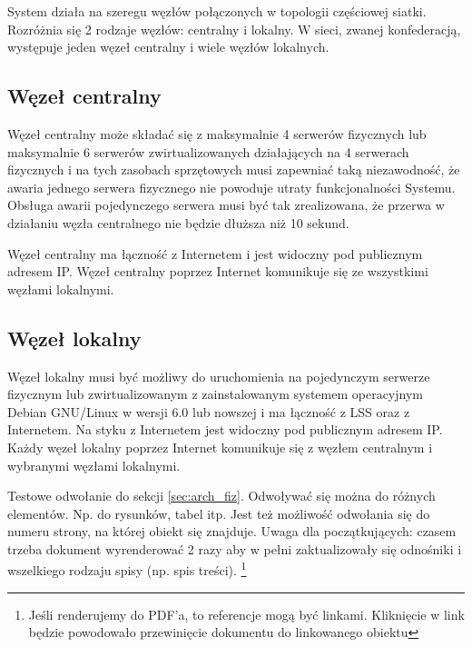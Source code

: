 \documentclass[a4paper]{report}
\begin{document}
System działa na szeregu węzłów połączonych w topologii częściowej siatki. Rozróżnia się 2 rodzaje węzłów: centralny i lokalny. W sieci, zwanej konfederacją, występuje jeden węzeł centralny i wiele węzłów lokalnych. 

\subsection{Węzeł centralny}
Węzeł centralny może składać się z maksymalnie 4 serwerów fizycznych lub maksymalnie 6 serwerów zwirtualizowanych działających na 4 serwerach fizycznych i na tych zasobach sprzętowych musi zapewniać taką 
niezawodność, że awaria jednego serwera fizycznego nie powoduje utraty funkcjonalności Systemu. Obsługa
awarii pojedynczego serwera musi być tak zrealizowana, że przerwa w działaniu węzła centralnego nie będzie dłuższa niż 10 sekund.

Węzeł centralny ma łączność z Internetem i jest widoczny pod publicznym adresem IP. Węzeł centralny poprzez Internet komunikuje się ze wszystkimi węzłami lokalnymi.

\subsection{Węzeł lokalny}
Węzeł lokalny musi być możliwy do uruchomienia na pojedynczym serwerze fizycznym lub zwirtualizowanym z zainstalowanym systemem operacyjnym Debian GNU/Linux w wersji 6.0 lub nowszej i ma łączność z LSS oraz z Internetem. Na styku z Internetem jest widoczny pod publicznym adresem IP. Każdy węzeł lokalny poprzez Internet komunikuje się z węzłem centralnym i wybranymi węzłami lokalnymi.  

Testowe odwołanie do sekcji \ref{sec:arch_fiz}. Odwoływać się można do różnych elementów. Np. do rysunków, tabel itp. Jest też możliwość odwołania się do numeru strony, na której obiekt się znajduje. Uwaga dla początkujących: czasem trzeba dokument wyrenderować 2 razy aby w pełni zaktualizowały się odnośniki i wszelkiego rodzaju spisy (np. spis treści).
\footnote{Jeśli renderujemy do PDF'a, to referencje mogą być linkami. Kliknięcie w link będzie powodowało przewinięcie dokumentu do linkowanego obiektu}
\end{document}

